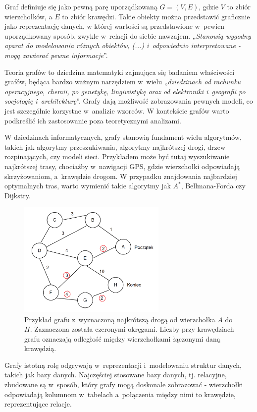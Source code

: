 Graf definiuje się jako pewną parę uporządkowaną $G = (V, E)$, gdzie $V$ to zbiór wierzchołków,
a $E$ to zbiór krawędzi.
Takie obiekty można przedstawić graficznie jako reprezentację danych,
w której wartości są przedstawione w~pewien uporządkowany sposób, zwykle w~relacji do siebie nawzajem.
„\textit{Stanowią wygodny aparat do modelowania różnych obiektów, (...) i~odpowiednio interpretowane
- mogą zawierać pewne informacje}”\cite{Wloch2008}.

Teoria grafów to dziedzina matematyki zajmująca się badaniem właściwości grafów,
będąca bardzo ważnym narzędziem w~wielu „\textit{dziedzinach od rachunku operacyjnego, chemii, po genetykę, lingiwistykę
oraz od elektroniki i~geografii po socjologię i~architekturę}”\cite{Wilson2012}.
Grafy dają możliwość zobrazowania pewnych modeli, co jest szczególnie korzystne w~analizie wzorców.
W kontekście grafów warto podkreślić ich zastosowanie poza teoretycznymi analizami.

W dziedzinach informatycznych, grafy stanowią fundament wielu algorytmów, takich jak algorytmy przeszukiwania,
algorytmy najkrótszej drogi, drzew rozpinających, czy modeli sieci.
Przykładem może być tutaj wyszukiwanie najkrótszej trasy, chociażby w~nawigacji GPS,
gdzie wierzchołki odpowiadają skrzyżowaniom, a~krawędzie drogom.
W przypadku znajdowania najbardziej optymalnych tras, warto wymienić takie algorytmy jak $A^*$, Bellmana-Forda czy Dijkstry.

\begin{figure}[ht]
	\centering
	\includegraphics[height=5.6cm]{resources/introduction/images/shortest_path.png}
	\caption{Przykład grafu z~wyznaczoną najkrótszą drogą od wierzchołka $A$ do $H$.
		Zaznaczona została czeronymi okręgami.
		Liczby przy krawędziach grafu oznaczają odległość między wierzchołkami łączonymi daną krawędzią.}
    \label{Fig:intro-1}
\end{figure}
\FloatBarrier

Grafy istotną rolę odgrywają w~reprezentacji i~modelowaniu struktur danych, takich jak bazy danych.
Najczęściej stosowane bazy danych, tj. relacyjne, zbudowane są w~sposób, który grafy mogą doskonale zobrazować -
wierzchołki odpowiadają kolumnom w~tabelach a~połączenia między nimi to krawędzie, reprezentujące relacje.

